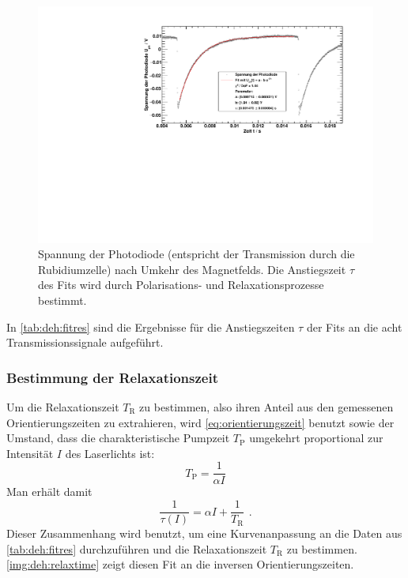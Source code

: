 \begin{figure}[H]
\begin{center}
  \includegraphics[width=\textwidth]{../img/part5/65-5mA-10.pdf}
  \caption{Spannung der Photodiode (entspricht der Transmission durch die Rubidiumzelle)
  nach Umkehr des Magnetfelds.
  Die Anstiegszeit $\tau$ des Fits wird durch Polarisations- und Relaxationsprozesse bestimmt.}
  \label{img:deh:trans3}
\end{center}
\end{figure}


In \autoref{tab:deh:fitres} sind die Ergebnisse für die Anstiegszeiten $\tau$
der Fits an die acht Transmissionssignale aufgeführt.




\subsubsection*{Bestimmung der Relaxationszeit}
Um die Relaxationszeit $T_\text{R}$ zu bestimmen, also ihren Anteil aus den gemessenen Orientierungszeiten zu extrahieren,
wird \autoref{eq:orientierungszeit} benutzt sowie der Umstand,
dass die charakteristische Pumpzeit $T_\text{P}$ umgekehrt proportional zur Intensität $I$ des Laserlichts ist:
\begin{equation}
  T_\text{P} = \frac{1}{\alpha I} 
\end{equation}
Man erhält damit
\begin{equation}
  \frac{1}{\tau(I)}=\alpha I + \frac{1}{T_\text{R}} \ \,.
\end{equation}
Dieser Zusammenhang wird benutzt, um eine Kurvenanpassung an die Daten aus \autoref{tab:deh:fitres}
durchzuführen und die Relaxationszeit $T_\text{R}$ zu bestimmen.
\autoref{img:deh:relaxtime} zeigt diesen Fit an die inversen Orientierungszeiten.

